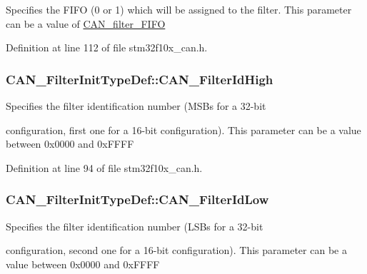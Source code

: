 Specifies the F\-I\-F\-O (0 or 1) which will be assigned to the filter. This parameter can be a value of \hyperlink{group___c_a_n__filter___f_i_f_o}{C\-A\-N\-\_\-filter\-\_\-\-F\-I\-F\-O} 

Definition at line 112 of file stm32f10x\-\_\-can.\-h.

\hypertarget{struct_c_a_n___filter_init_type_def_afc109aa8eedced09d296605f2eb871f7}{
\subsubsection[{C\-A\-N\-\_\-\-Filter\-Id\-High}]{ C\-A\-N\-\_\-\-Filter\-Init\-Type\-Def\-::\-C\-A\-N\-\_\-\-Filter\-Id\-High}}\label{struct_c_a_n___filter_init_type_def_afc109aa8eedced09d296605f2eb871f7}
\begin{DoxyVerb}             Specifies the filter identification number (MSBs for a 32-bit
\end{DoxyVerb}
 configuration, first one for a 16-\/bit configuration). This parameter can be a value between 0x0000 and 0x\-F\-F\-F\-F 

Definition at line 94 of file stm32f10x\-\_\-can.\-h.

\hypertarget{struct_c_a_n___filter_init_type_def_ab8c56b48ac323e8c7a1b535c79a51f87}{
\subsubsection[{C\-A\-N\-\_\-\-Filter\-Id\-Low}]{ C\-A\-N\-\_\-\-Filter\-Init\-Type\-Def\-::\-C\-A\-N\-\_\-\-Filter\-Id\-Low}}\label{struct_c_a_n___filter_init_type_def_ab8c56b48ac323e8c7a1b535c79a51f87}
\begin{DoxyVerb}              Specifies the filter identification number (LSBs for a 32-bit
\end{DoxyVerb}
 configuration, second one for a 16-\/bit configuration). This parameter can be a value between 0x0000 and 0x\-F\-F\-F\-F 


